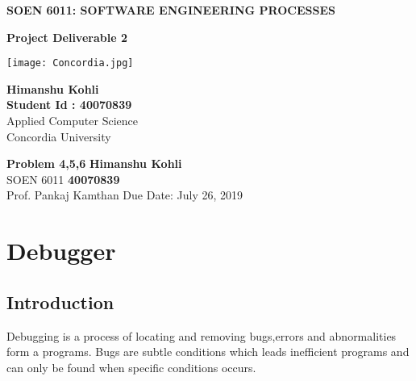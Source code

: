 \documentclass[a4paper, 11pt]{article}
\begin{document}
\begin{titlepage}
   \begin{center}
       \vspace*{1cm}
 
       \textbf{\huge{SOEN 6011: SOFTWARE ENGINEERING PROCESSES}}
 
       \vspace{0.5cm}
        \textbf{\huge{Project Deliverable 2}}
 
       \vspace{1.0cm}
       \vskip 1.4in
    \texttt{[image: Concordia.jpg]}
       
       \vskip 1.4in
 
       \vspace{0.8cm}
       
        \textbf{Himanshu Kohli}\\
        \textbf{Student Id : 40070839}\\
       Applied Computer Science\\
       Concordia University\\
       
 
   \end{center}
\end{titlepage}

\noindent
\large\textbf{Problem 4,5,6} \hfill \textbf{Himanshu Kohli} \\
\normalsize SOEN 6011 \hfill \textbf{40070839} \\
Prof. Pankaj Kamthan \hfill Due Date: July 26, 2019 \\


\section{Debugger}
\subsection{Introduction}
Debugging is a process of locating and removing bugs,errors and abnormalities form a programs. Bugs are subtle conditions which leads inefficient programs and can only be found when specific conditions occurs.
\end{document}
